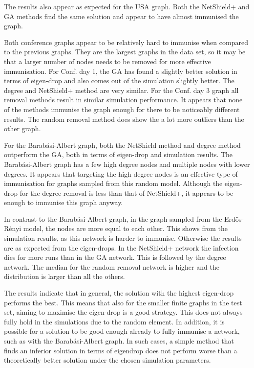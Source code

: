 \documentclass[11pt]{article}
\theoremstyle{definition}
\begin{document}
The results also appear as expected for the USA graph. Both the NetShield+ and GA methods find the same solution and appear to have almost immunised the graph.

Both conference graphs appear to be relatively hard to immunise when compared to the previous graphs. They are the largest graphs in the data set, so it may be that a larger number of nodes needs to be removed for more effective immunisation. For Conf. day 1, the GA has found a slightly better solution in terms of eigen-drop and also comes out of the simulation slightly better. The degree and NetShield+ method are very similar. For the Conf. day 3 graph all removal methods result in similar simulation performance. It appears that none of the methods immunise the graph enough for there to be noticeably different results. The random removal method does show the a lot more outliers than the other graph.

For the Barab\'asi-Albert graph, both the NetShield method and degree method outperform the GA, both in terms of eigen-drop and simulation results. The Barab\'asi-Albert graph has a few high degree nodes and multiple nodes with lower degrees. It appears that targeting the high degree nodes is an effective type of immunisation for graphs sampled from this random model. Although the eigen-drop for the degree removal is less than that of NetShield+, it appears to be enough to immunise this graph anyway.

In contrast to the Barab\'asi-Albert graph, in the graph sampled from the Erd\H{o}s-R\'enyi model, the nodes are more equal to each other. This shows from the simulation results, as this network is harder to immunise. Otherwise the results are as expected from the eigen-drops. In the NetShield+ network the infection dies for more runs than in the GA network. This is followed by the degree network. The median for the random removal network is higher and the distribution is larger than all the others.

The results indicate that in general, the solution with the highest eigen-drop performs the best. This means that also for the smaller finite graphs in the test set, aiming to maximise the eigen-drop is a good strategy. This does not always fully hold in the simulations due to the random element. In addition, it is possible for a solution to be good enough already to fully immunise a network, such as with the Barab\'asi-Albert graph. In such cases, a simple method that finds an inferior solution in terms of eigendrop does not perform worse than a theoretically better solution under the chosen simulation parameters.
\end{document}
